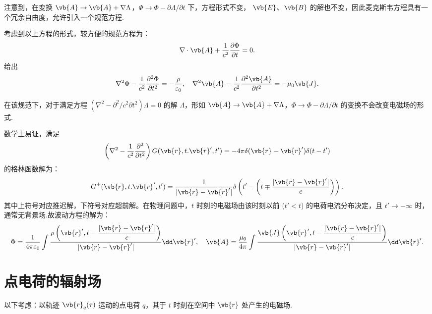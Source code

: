 注意到，在变换 \(\vb{A} \to \vb{A} + \nabla \Lambda\)，\(\Phi \to \Phi - \partial \Lambda/\partial t\) 下，方程形式不变，
\(\vb{E}\)、\(\vb{B}\) 的解也不变，因此麦克斯韦方程具有一个冗余自由度，允许引入一个规范方程.

考虑到以上方程的形式，较方便的规范方程为：
\begin{align*}
	\nabla \cdot \vb{A} + \dfrac{1}{c^2} \dfrac{\partial \Phi}{\partial t} = 0.
\end{align*}
给出
\begin{align*}
	\nabla^2 \Phi - \dfrac{1}{c^2} \dfrac{\partial^2 \Phi}{\partial t^2} = -\dfrac{\rho}{\varepsilon_0},\quad
	\nabla^2 \vb{A} - \dfrac{1}{c^2} \dfrac{\partial^2 \vb{A}}{\partial t^2} = -\mu_0 \vb{J}.
\end{align*}

在该规范下，对于满足方程 \(\left( \nabla^2 - \partial^2/c^2\partial t^2 \right) \Lambda = 0\) 的解 \(\Lambda\)，形如 \(\vb{A} \to \vb{A} + \nabla \Lambda\)，\(\Phi \to \Phi - \partial\Lambda/\partial t\) 的变换不会改变电磁场的形式.

数学上易证，满足
\begin{align*}
	\left( \nabla^2 - \dfrac{1}{c^2} \dfrac{\partial^2}{\partial t^2} \right) G(\vb{r}, t. \vb{r}', t') = -4\pi \delta(\vb{r} - \vb{r}') \delta(t - t')
\end{align*}
的格林函数解为：
\begin{align*}
	G^{\pm}(\vb{r}, t. \vb{r}', t') = \dfrac{1}{|\vb{r} - \vb{r}'|} \delta\left( t' - \left( t \mp \dfrac{|\vb{r} - \vb{r}'|}{c} \right) \right).
\end{align*}
其中上符号对应推迟解，下符号对应超前解。在物理问题中，\(t\) 时刻的电磁场由该时刻以前 (\(t' < t\)) 的电荷电流分布决定，且 \(t' \to -\infty\) 时，通常无背景场.故波动方程的解为：
\begin{align*}
	\Phi = \dfrac{1}{4\pi \varepsilon_0} \int \dfrac{\rho\left( \vb{r}', t - \dfrac{|\vb{r} - \vb{r}'|}{c} \right)}{|\vb{r} - \vb{r}'|} \dd \vb{r}',\quad
	\vb{A} = \dfrac{\mu_0}{4\pi} \int \dfrac{\vb{J}\left( \vb{r}', t - \dfrac{|\vb{r} - \vb{r}'|}{c} \right)}{|\vb{r} - \vb{r}'|} \dd \vb{r}'.
\end{align*}

\section{点电荷的辐射场}
以下考虑：以轨迹 \(\vb{r}_q(\tau)\) 运动的点电荷 \(q\)，其于 \(t\) 时刻在空间中 \(\vb{r}\) 处产生的电磁场.

